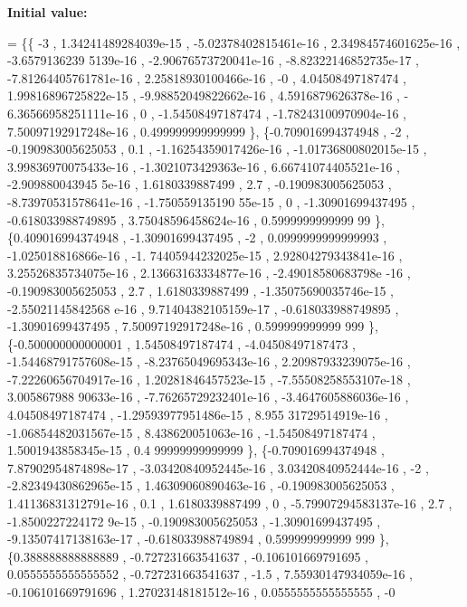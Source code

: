 {\bfseries Initial value\+:}
\begin{DoxyCode}
= \{\{               -3 , 1.34241489284039e-15 , -5.02378402815461e-16 , 2.34984574601625e-16 , -3.6579136239
      5139e-16 , -2.90676573720041e-16 , -8.82322146852735e-17 , -7.81264405761781e-16 , 2.25818930100466e-16 ,   
                   -0 ,  4.04508497187474 , 1.99816896725822e-15 , -9.98852049822662e-16 , 4.5916879626378e-16 , -
      6.36566958251111e-16 ,                 0 , -1.54508497187474 , -1.78243100970904e-16 , 7.50097192917248e-16 
      , 0.499999999999999 \},
\{-0.709016994374948 ,                -2 , -0.190983005625053 ,               0.1 , -1.16254359017426e-16 , 
      -1.01736800802015e-15 , 3.99836970075433e-16 , -1.3021073429363e-16 , 6.66741074405521e-16 , -2.909880043945
      5e-16 ,   1.6180339887499 ,               2.7 , -0.190983005625053 , -8.73970531578641e-16 , -1.750559135190
      55e-15 ,                 0 , -1.30901699437495 , -0.618033988749895 , 3.75048596458624e-16 , 0.5999999999999
      99 \},
\{0.409016994374948 , -1.30901699437495 ,                -2 , 0.0999999999999993 , -1.025018816866e-16 , -1.
      74405944232025e-15 , 2.92804279343841e-16 , 3.25526835734075e-16 , 2.13663163334877e-16 , -2.49018580683798e
      -16 , -0.190983005625053 ,               2.7 ,   1.6180339887499 , -1.35075690035746e-15 , -2.55021145842568
      e-16 , 9.71404382105159e-17 , -0.618033988749895 , -1.30901699437495 , 7.50097192917248e-16 , 0.599999999999
      999 \},
\{-0.500000000000001 ,  1.54508497187474 , -4.04508497187473 , -1.54468791757608e-15 , -8.23765049695343e-16
       , 2.20987933239075e-16 , -7.22260656704917e-16 , 1.20281846457523e-15 , -7.55508258553107e-18 , 3.005867988
      90633e-16 , -7.76265729232401e-16 , -3.4647605886036e-16 ,  4.04508497187474 , -1.29593977951486e-15 , 8.955
      31729514919e-16 , -1.06854482031567e-15 , 8.438620051063e-16 , -1.54508497187474 , 1.5001943858345e-15 , 0.4
      99999999999999 \},
\{-0.709016994374948 , 7.87902954874898e-17 , -3.03420840952445e-16 , 3.03420840952444e-16 ,                
      -2 , -2.82349430862965e-15 , 1.46309060890463e-16 , -0.190983005625053 , 1.41136831312791e-16 ,             
        0.1 ,   1.6180339887499 ,                 0 , -5.79907294583137e-16 ,               2.7 , -1.8500227224172
      9e-15 , -0.190983005625053 , -1.30901699437495 , -9.13507417138163e-17 , -0.618033988749894 , 0.599999999999
      999 \},
\{0.388888888888889 , -0.727231663541637 , -0.106101669791695 , 0.0555555555555552 , -0.727231663541637 ,   
                 -1.5 , 7.55930147934059e-16 , -0.106101669791696 , 1.27023148181512e-16 , 0.0555555555555555 , -0

\end{DoxyCode}
